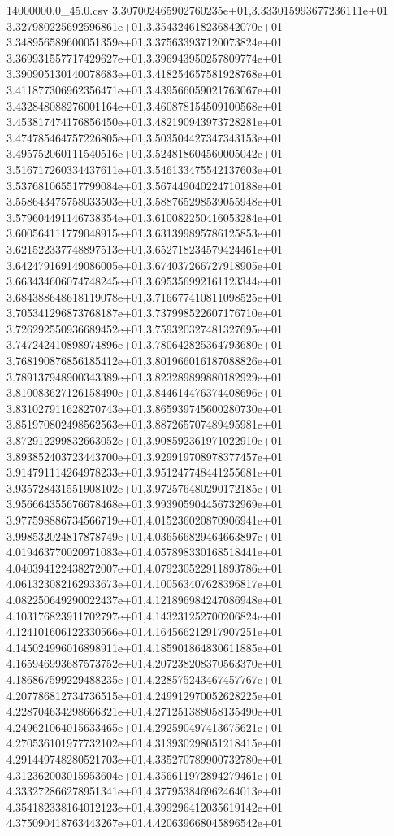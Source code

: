 \begin{filecontents*}{14000000.0_45.0.csv}
3.307002465902760235e+01,3.333015993677236111e+01
3.327980225692596861e+01,3.354324618236842070e+01
3.348956589600051359e+01,3.375633937120073824e+01
3.369931557717429627e+01,3.396943950257809774e+01
3.390905130140078683e+01,3.418254657581928768e+01
3.411877306962356471e+01,3.439566059021763067e+01
3.432848088276001164e+01,3.460878154509100568e+01
3.453817474176856450e+01,3.482190943973728281e+01
3.474785464757226805e+01,3.503504427347343153e+01
3.495752060111540516e+01,3.524818604560005042e+01
3.516717260334437611e+01,3.546133475542137603e+01
3.537681065517799084e+01,3.567449040224710188e+01
3.558643475758033503e+01,3.588765298539055948e+01
3.579604491146738354e+01,3.610082250416053284e+01
3.600564111779048915e+01,3.631399895786125853e+01
3.621522337748897513e+01,3.652718234579424461e+01
3.642479169149086005e+01,3.674037266727918905e+01
3.663434606074748245e+01,3.695356992161123344e+01
3.684388648618119078e+01,3.716677410811098525e+01
3.705341296873768187e+01,3.737998522607176710e+01
3.726292550936689452e+01,3.759320327481327695e+01
3.747242410898974896e+01,3.780642825364793680e+01
3.768190876856185412e+01,3.801966016187088826e+01
3.789137948900343389e+01,3.823289899880182929e+01
3.810083627126158490e+01,3.844614476374408696e+01
3.831027911628270743e+01,3.865939745600280730e+01
3.851970802498562563e+01,3.887265707489495981e+01
3.872912299832663052e+01,3.908592361971022910e+01
3.893852403723443700e+01,3.929919708978377457e+01
3.914791114264978233e+01,3.951247748441255681e+01
3.935728431551908102e+01,3.972576480290172185e+01
3.956664355676678468e+01,3.993905904456732969e+01
3.977598886734566719e+01,4.015236020870906941e+01
3.998532024817878749e+01,4.036566829464663897e+01
4.019463770020971083e+01,4.057898330168518441e+01
4.040394122438272007e+01,4.079230522911893786e+01
4.061323082162933673e+01,4.100563407628396817e+01
4.082250649290022437e+01,4.121896984247086948e+01
4.103176823911702797e+01,4.143231252700206824e+01
4.124101606122330566e+01,4.164566212917907251e+01
4.145024996016898911e+01,4.185901864830611885e+01
4.165946993687573752e+01,4.207238208370563370e+01
4.186867599229488235e+01,4.228575243467457767e+01
4.207786812734736515e+01,4.249912970052628225e+01
4.228704634298666321e+01,4.271251388058135490e+01
4.249621064015633465e+01,4.292590497413675621e+01
4.270536101977732102e+01,4.313930298051218415e+01
4.291449748280521703e+01,4.335270789900732780e+01
4.312362003015953604e+01,4.356611972894279461e+01
4.333272866278951341e+01,4.377953846962464013e+01
4.354182338164012123e+01,4.399296412035619142e+01
4.375090418763443267e+01,4.420639668045896542e+01

\end{filecontents*}
